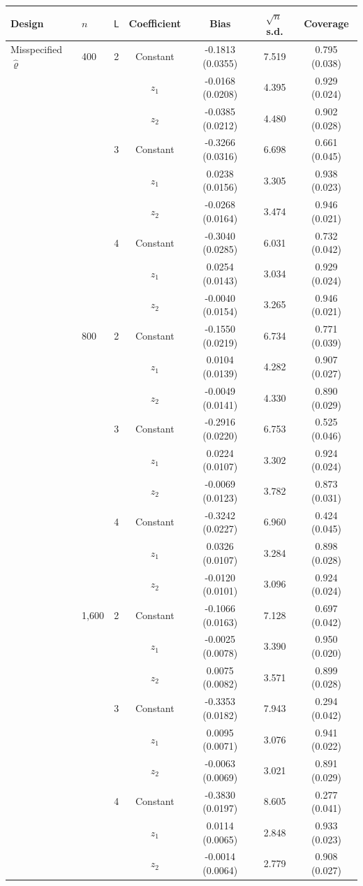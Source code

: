 \begin{tabular}{llccccc}
\toprule
Design & $n$ & $\mathsf L$ & Coefficient & Bias & $\sqrt{n}\,$s.d. & Coverage \\
\midrule
Misspecified $\hat\varrho$ & 400 & 2 & Constant & -0.1813 (0.0355) & 7.519 & 0.795 (0.038) \\
 &  &  & $z_1$ & -0.0168 (0.0208) & 4.395 & 0.929 (0.024) \\
 &  &  & $z_2$ & -0.0385 (0.0212) & 4.480 & 0.902 (0.028) \\
\addlinespace
 &  & 3 & Constant & -0.3266 (0.0316) & 6.698 & 0.661 (0.045) \\
 &  &  & $z_1$ & 0.0238 (0.0156) & 3.305 & 0.938 (0.023) \\
 &  &  & $z_2$ & -0.0268 (0.0164) & 3.474 & 0.946 (0.021) \\
\addlinespace
 &  & 4 & Constant & -0.3040 (0.0285) & 6.031 & 0.732 (0.042) \\
 &  &  & $z_1$ & 0.0254 (0.0143) & 3.034 & 0.929 (0.024) \\
 &  &  & $z_2$ & -0.0040 (0.0154) & 3.265 & 0.946 (0.021) \\
\addlinespace
 & 800 & 2 & Constant & -0.1550 (0.0219) & 6.734 & 0.771 (0.039) \\
 &  &  & $z_1$ & 0.0104 (0.0139) & 4.282 & 0.907 (0.027) \\
 &  &  & $z_2$ & -0.0049 (0.0141) & 4.330 & 0.890 (0.029) \\
\addlinespace
 &  & 3 & Constant & -0.2916 (0.0220) & 6.753 & 0.525 (0.046) \\
 &  &  & $z_1$ & 0.0224 (0.0107) & 3.302 & 0.924 (0.024) \\
 &  &  & $z_2$ & -0.0069 (0.0123) & 3.782 & 0.873 (0.031) \\
\addlinespace
 &  & 4 & Constant & -0.3242 (0.0227) & 6.960 & 0.424 (0.045) \\
 &  &  & $z_1$ & 0.0326 (0.0107) & 3.284 & 0.898 (0.028) \\
 &  &  & $z_2$ & -0.0120 (0.0101) & 3.096 & 0.924 (0.024) \\
\addlinespace
 & 1,600 & 2 & Constant & -0.1066 (0.0163) & 7.128 & 0.697 (0.042) \\
 &  &  & $z_1$ & -0.0025 (0.0078) & 3.390 & 0.950 (0.020) \\
 &  &  & $z_2$ & 0.0075 (0.0082) & 3.571 & 0.899 (0.028) \\
\addlinespace
 &  & 3 & Constant & -0.3353 (0.0182) & 7.943 & 0.294 (0.042) \\
 &  &  & $z_1$ & 0.0095 (0.0071) & 3.076 & 0.941 (0.022) \\
 &  &  & $z_2$ & -0.0063 (0.0069) & 3.021 & 0.891 (0.029) \\
\addlinespace
 &  & 4 & Constant & -0.3830 (0.0197) & 8.605 & 0.277 (0.041) \\
 &  &  & $z_1$ & 0.0114 (0.0065) & 2.848 & 0.933 (0.023) \\
 &  &  & $z_2$ & -0.0014 (0.0064) & 2.779 & 0.908 (0.027) \\
\bottomrule
\end{tabular}
